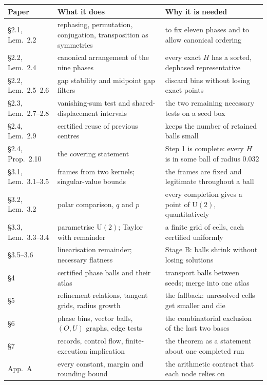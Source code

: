 \documentclass[11pt]{article}
\theoremstyle{definition}
\theoremstyle{plain}
\theoremstyle{definition}
\newcommand{\U}{\mathrm{U}}
\begin{document}
\begin{center}
\small
\begin{tabular}{@{}p{3.5cm}p{5.4cm}p{5.4cm}@{}}
\toprule
\textbf{Paper} & \textbf{What it does} & \textbf{Why it is needed} \\
\midrule
\S2.1, Lem.~2.2 & rephasing, permutation, conjugation, transposition as symmetries & to fix eleven phases and to allow canonical ordering \\
\S2.2, Lem.~2.4 & canonical arrangement of the nine phases & every exact $H$ has a sorted, dephased representative \\
\S2.2, Lem.~2.5--2.6 & gap stability and midpoint gap filters & discard bins without losing exact points \\
\S2.3, Lem.~2.7--2.8 & vanishing-sum test and shared-displacement intervals & the two remaining necessary tests on a seed box \\
\S2.4, Lem.~2.9 & certified reuse of previous centres & keeps the number of retained balls small \\
\S2.4, Prop.~2.10 & the covering statement & Step 1 is complete: every $H$ is in some ball of radius $0.032$ \\
\S3.1, Lem.~3.1--3.5 & frames from two kernels; singular-value bounds & the frames are fixed and legitimate throughout a ball \\
\S3.2, Lem.~3.2 & polar comparison, $q$ and $p$ & every completion gives a point of $\U(2)$, quantitatively \\
\S3.3, Lem.~3.3--3.4 & parametrise $\U(2)$; Taylor with remainder & a finite grid of cells, each certified uniformly \\
\S3.5--3.6 & linearisation remainder; necessary flatness & Stage B: balls shrink without losing solutions \\
\S4 & certified phase balls and their atlas & transport balls between seeds; merge into one atlas \\
\S5 & refinement relations, tangent grids, radius growth & the fallback: unresolved cells get smaller and die \\
\S6 & phase bins, vector balls, $(O,U)$ graphs, edge tests & the combinatorial exclusion of the last two bases \\
\S7 & records, control flow, finite-execution implication & the theorem as a statement about one completed run \\
App.~A & every constant, margin and rounding bound & the arithmetic contract that each node relies on \\
\bottomrule
\end{tabular}
\end{center}
\end{document}
